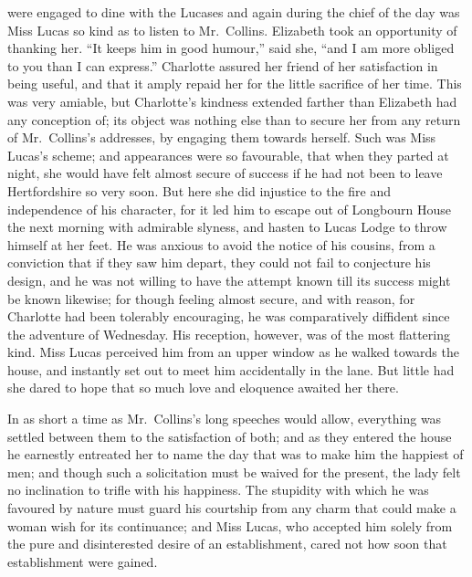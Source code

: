  were engaged to dine with the Lucases and again
during the chief of the day was Miss Lucas so kind as to listen
to Mr.\ Collins.  Elizabeth took an opportunity of thanking her.
``It keeps him in good humour,'' said she, ``and I am more obliged
to you than I can express.''  Charlotte assured her friend of
her satisfaction in being useful, and that it amply repaid her
for the little sacrifice of her time.  This was very amiable,
but Charlotte's kindness extended farther than Elizabeth had
any conception of; its object was nothing else than to secure
her from any return of Mr.\ Collins's addresses, by engaging
them towards herself.  Such was Miss Lucas's scheme; and
appearances were so favourable, that when they parted at night,
she would have felt almost secure of success if he had not been
to leave Hertfordshire so very soon.  But here she did injustice
to the fire and independence of his character, for it led
him to escape out of Longbourn House the next morning with
admirable slyness, and hasten to Lucas Lodge to throw himself
at her feet.  He was anxious to avoid the notice of his cousins,
from a conviction that if they saw him depart, they could not
fail to conjecture his design, and he was not willing to have
the attempt known till its success might be known likewise; for
though feeling almost secure, and with reason, for Charlotte had
been tolerably encouraging, he was comparatively diffident since
the adventure of Wednesday.  His reception, however, was of
the most flattering kind.  Miss Lucas perceived him from an
upper window as he walked towards the house, and instantly set
out to meet him accidentally in the lane.  But little had she
dared to hope that so much love and eloquence awaited her there.

In as short a time as Mr.\ Collins's long speeches would allow,
everything was settled between them to the satisfaction of both;
and as they entered the house he earnestly entreated her to name
the day that was to make him the happiest of men; and though
such a solicitation must be waived for the present, the lady felt
no inclination to trifle with his happiness.  The stupidity with
which he was favoured by nature must guard his courtship from
any charm that could make a woman wish for its continuance;
and Miss Lucas, who accepted him solely from the pure and
disinterested desire of an establishment, cared not how soon
that establishment were gained.

